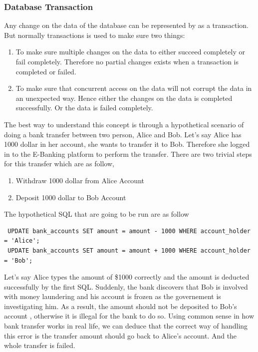 \documentclass[a4paper]{article}
\begin{document}
\subsubsection{Database Transaction}
Any change on the data of the database can be represented by as a transaction. But normally transactions is used to make sure two things:\\

\begin{enumerate}
\item To make sure multiple changes on the data to either succeed completely or fail completely. Therefore no partial changes exists when a transaction is completed or failed.
\item To make sure that concurrent access on the data will not corrupt the data in an unexpected way. Hence either the changes on the data is completed successfully. Or the data is failed completely.
\end{enumerate}

The best way to understand this concept is through a hypothetical scenario of doing a bank transfer between two person, Alice and Bob. Let’s say Alice has 1000 dollar in her account, she wants to transfer it to Bob. Therefore she logged in to the E-Banking platform to perform the transfer. There are two trivial steps for this transfer which are as follow,\\

\begin{enumerate}
\item Withdraw 1000 dollar from Alice Account
\item Deposit 1000 dollar to Bob Account
\end{enumerate}

The hypothetical SQL that are going to be run are as follow

\begin{lstlisting}
 UPDATE bank_accounts SET amount = amount - 1000 WHERE account_holder = 'Alice';
 UPDATE bank_accounts SET amount = amount + 1000 WHERE account_holder = 'Bob';
\end{lstlisting}

Let’s say Alice types the amount of \$1000 correctly and the amount is deducted successfully by the first SQL. Suddenly, the bank discovers that Bob is involved with money laundering and his account is frozen as the governement is investigating him. As a result, the amount should not be deposited to Bob’s account , otherwise it is illegal for the bank to do so. Using common sense in how bank transfer works in real life, we can deduce that the correct way of handling this error is the transfer amount should go back to Alice’s account. And the whole transfer is failed.\\
\end{document}

